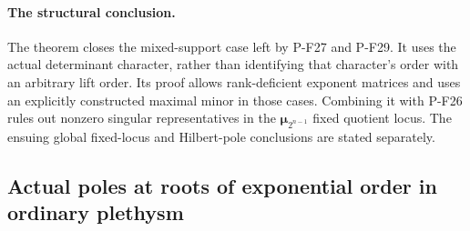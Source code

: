 \paragraph{The structural conclusion.}
The theorem closes the mixed-support case left by
P-F27 and P-F29. It uses the actual determinant
character, rather than identifying that character's
order with an arbitrary lift order. Its proof
allows rank-deficient exponent matrices and uses
an explicitly constructed maximal minor in those
cases. Combining it with P-F26 rules out
nonzero singular representatives in the
$\boldsymbol\mu_{2^{n-1}}$ fixed quotient locus.
The ensuing global fixed-locus and Hilbert-pole
conclusions are stated separately.



\subsection{Actual poles at roots of exponential order in ordinary plethysm}

